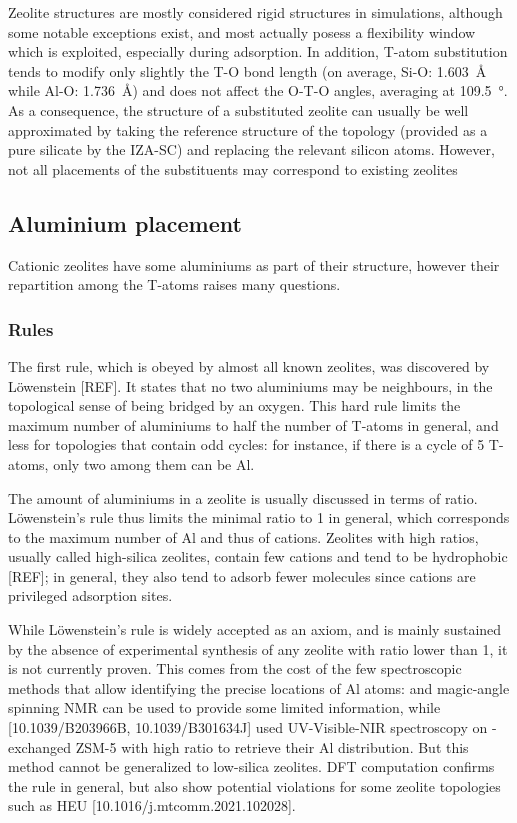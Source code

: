 \documentclass[main.tex]{subfiles}
\begin{document}
Zeolite structures are mostly considered rigid structures in simulations, although some notable exceptions exist\autocite{RHOFlexibility,MFIFlexibility}, and most actually posess a flexibility window\autocite{ZeoliteFlexibility} which is exploited, especially during adsorption\autocite{ZeoliteInducedFlexibility}. In addition, T-atom substitution tends to modify only slightly the T-O bond length (on average, Si-O: \qty{1.603}{\angstrom} while Al-O: \qty{1.736}{\angstrom}) and does not affect the O-T-O angles, averaging at \qty{109.5}{\degree}\autocite{ZeoliteBondAngles}. As a consequence, the structure of a substituted zeolite can usually be well approximated by taking the reference structure of the topology (provided as a pure silicate by the IZA-SC) and replacing the relevant silicon atoms. However, not all placements of the substituents may correspond to existing zeolites

\subsection{Aluminium placement}

Cationic zeolites have some aluminiums as part of their structure, however their repartition among the T-atoms raises many questions.

\subsubsection{Rules}

The first rule, which is obeyed by almost all known zeolites, was discovered by L\"owenstein [REF]. It states that no two aluminiums may be neighbours, in the topological sense of being bridged by an oxygen. This hard rule limits the maximum number of aluminiums to half the number of T-atoms in general, and less for topologies that contain odd cycles: for instance, if there is a cycle of 5 T-atoms, only two among them can be Al.

The amount of aluminiums in a zeolite is usually discussed in terms of \SiAl ratio. L\"owenstein's rule thus limits the minimal \SiAl ratio to 1 in general, which corresponds to the maximum number of Al and thus of cations. Zeolites with high \SiAl ratios, usually called high-silica zeolites, contain few cations and tend to be hydrophobic [REF]; in general, they also tend to adsorb fewer molecules since cations are privileged adsorption sites.

While L\"owenstein's rule is widely accepted as an axiom, and is mainly sustained by the absence of experimental synthesis of any zeolite with \SiAl ratio lower than 1, it is not currently proven. This comes from the cost of the few spectroscopic methods that allow identifying the precise locations of Al atoms:  and  magic-angle spinning NMR can be used to provide some limited information, while [10.1039/B203966B, 10.1039/B301634J] used UV-Visible-NIR spectroscopy on -exchanged ZSM-5 with high \SiAl ratio to retrieve their Al distribution. But this method cannot be generalized to low-silica zeolites. DFT computation confirms the rule in general, but also show potential violations for some zeolite topologies such as HEU [10.1016/j.mtcomm.2021.102028].
\end{document}
